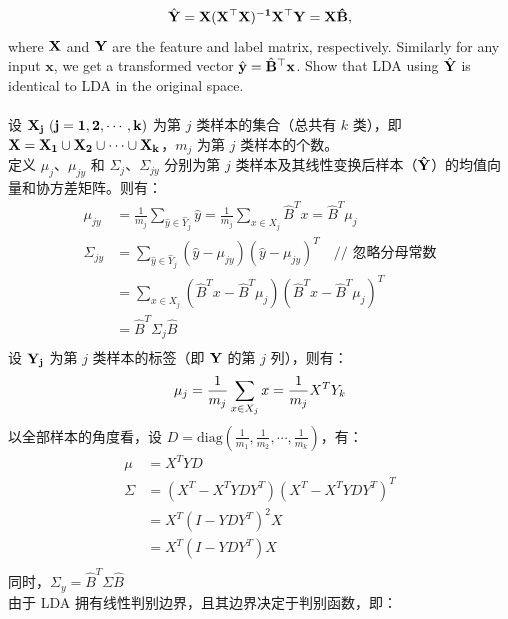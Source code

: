 \documentclass{article}
\begin{document}
	\begin{equation*}
	\hat{\bf Y} = \bf X(\bf X^{\top} \bf X)^{-1}\bf X^{\top}\bf Y = \bf X\hat{\bf B},
	\end{equation*}
	where $\bf X$ and $\bf Y$ are the feature and label matrix, respectively.
	 Similarly for any input $\mathbf{x}$, we get a transformed vector $\hat{\mathbf{y}} = \hat{\bf B}^{\top}\mathbf{x}$. Show that LDA using $\hat{\bf Y}$ is identical to LDA in the original space. \\ \\
    设 $\bf X_j\ (j=1,2,\cdots,k)$ 为第 $j$ 类样本的集合（总共有 $k$ 类），即 $\bf X = \bf X_1 \cup \bf X_2 \cup \cdots \cup \bf X_k$，$m_j$ 为第 $j$ 类样本的个数。\\
    定义 $\mu_j$、$\mu_{jy}$ 和 $\Sigma_j$、$\Sigma_{jy}$ 分别为第 $j$ 类样本及其线性变换后样本（$\bf \hat{Y}$）的均值向量和协方差矩阵。则有：\\
    \begin{align}
    \mu_{jy} &= \frac{1}{m_j}\sum_{\hat{y}\in \hat{Y}_j}\hat{y} = \frac{1}{m_j}\sum_{x\in X_j}\hat{B}^T x = \hat{B}^T \mu_j \\
    \Sigma_{jy}
    &= \sum_{\hat{y}\in \hat{Y}_j} (\hat{y} - \mu_{jy}) (\hat{y} - \mu_{jy})^T \quad \text{// 忽略分母常数} \\
    &= \sum_{x\in X_j} (\hat{B}^T x-\hat{B}^T \mu_j) (\hat{B}^T x-\hat{B}^T \mu_j)^T \\
    &= \hat{B}^T \Sigma_j \hat{B} \\
    \end{align}
    设 $\bf Y_j$ 为第 $j$ 类样本的标签（即 $\bf Y$ 的第 $j$ 列），则有：
    \begin{equation}
    \mu_j = \frac{1}{m_j}\sum_{x\in X_j}x = \frac{1}{m_j} X^T Y_k \\
    \end{equation}
    以全部样本的角度看，设 $D = \mathrm{diag}(\frac{1}{m_1}, \frac{1}{m_2}, \cdots, \frac{1}{m_k})$，有：\\
    \begin{align}
    \mu &= X^T YD \\
    \Sigma
    &= (X^T - X^T YDY^T) (X^T - X^T YDY^T)^T \\
    &= X^T (I - YDY^T)^2 X \\
    &= X^T (I - YDY^T) X \\
    \end{align}
    同时，$\Sigma_y = \hat{B}^T \Sigma \hat{B}$\\
    由于 LDA 拥有线性判别边界，且其边界决定于判别函数\cite{ref1}，即：
\end{document}
